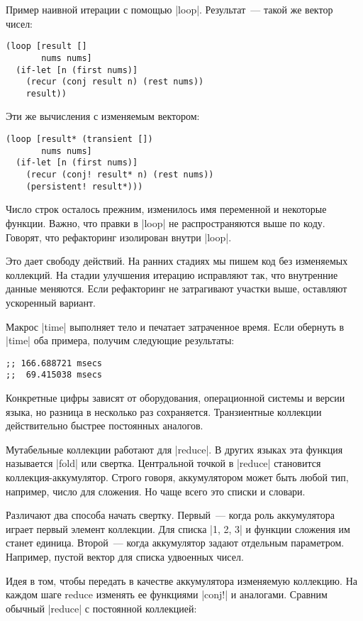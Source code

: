 Пример наивной итерации с помощью \spverb|loop|. Результат~--- такой же вектор чисел:

\begin{verbatim}
(loop [result []
       nums nums]
  (if-let [n (first nums)]
    (recur (conj result n) (rest nums))
    result))
\end{verbatim}

Эти же вычисления с изменяемым вектором:

\begin{verbatim}
(loop [result* (transient [])
       nums nums]
  (if-let [n (first nums)]
    (recur (conj! result* n) (rest nums))
    (persistent! result*)))
\end{verbatim}

Число строк осталось прежним, изменилось имя переменной и некоторые
функции. Важно, что правки в \spverb|loop| не распространяются выше по коду. Говорят,
что рефакторинг изолирован внутри \spverb|loop|.

Это дает свободу действий. На ранних стадиях мы пишем код без изменяемых
коллекций. На стадии улучшения итерацию исправляют так, что внутренние данные
меняются. Если рефакторинг не затрагивают участки выше, оставляют ускоренный
вариант.

Макрос \spverb|time| выполняет тело и печатает затраченное время. Если обернуть в
\spverb|time| оба примера, получим следующие результаты:

\begin{verbatim}
;; 166.688721 msecs
;;  69.415038 msecs
\end{verbatim}

Конкретные цифры зависят от оборудования, операционной системы и версии языка,
но разница в несколько раз сохраняется. Транзиентные коллекции действительно
быстрее постоянных аналогов.

Мутабельные коллекции работают для \spverb|reduce|. В других языках эта функция
называется \spverb|fold| или свертка. Центральной точкой в \spverb|reduce| становится
коллекция-аккумулятор. Строго говоря, аккумулятором может быть любой тип,
например, число для сложения. Но чаще всего это списки и словари.

Различают два способа начать свертку. Первый~--- когда роль аккумулятора играет
первый элемент коллекции. Для списка \spverb|1, 2, 3| и функции сложения им станет
единица. Второй~--- когда аккумулятор задают отдельным параметром. Например,
пустой вектор для списка удвоенных чисел.

Идея в том, чтобы передать в качестве аккумулятора изменяемую коллекцию. На
каждом шаге reduce изменять ее функциями \spverb|conj!| и аналогами. Сравним обычный
\spverb|reduce| с постоянной коллекцией:

